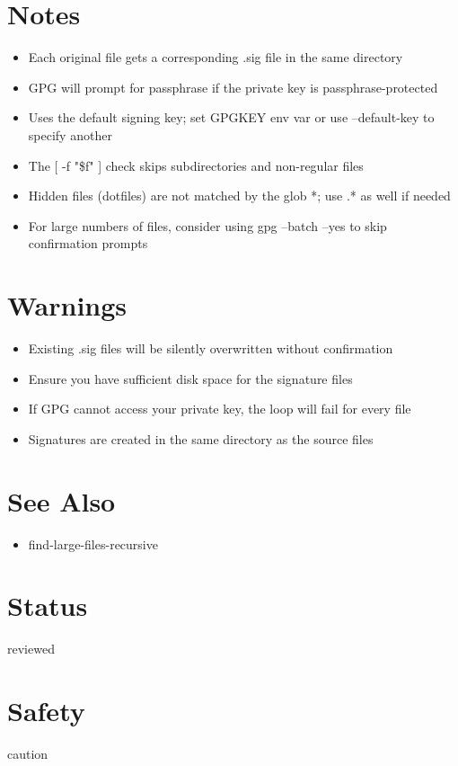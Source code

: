 \documentclass[openany]{book}
\begin{document}
\section*{Notes}
\begin{itemize}
  \item Each original file gets a corresponding .sig file in the same directory
  \item GPG will prompt for passphrase if the private key is passphrase-protected
  \item Uses the default signing key; set GPGKEY env var or use --default-key to specify another
  \item The [ -f "\$f" ] check skips subdirectories and non-regular files
  \item Hidden files (dotfiles) are not matched by the glob *; use .* as well if needed
  \item For large numbers of files, consider using gpg --batch --yes to skip confirmation prompts
\end{itemize}

\section*{Warnings}
\begin{itemize}
  \item Existing .sig files will be silently overwritten without confirmation
  \item Ensure you have sufficient disk space for the signature files
  \item If GPG cannot access your private key, the loop will fail for every file
  \item Signatures are created in the same directory as the source files
\end{itemize}

\section*{See Also}
\begin{itemize}
  \item find-large-files-recursive
\end{itemize}

\section*{Status}
reviewed

\section*{Safety}
caution
\end{document}
